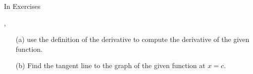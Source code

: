 {\noindent In Exercises}
{,\begin{enumerate}
\item[(a)] use the definition of the derivative to compute the derivative of the given function.
\item[(b)] Find the tangent line to the graph of the given function at $x=c$.
\end{enumerate}
}
